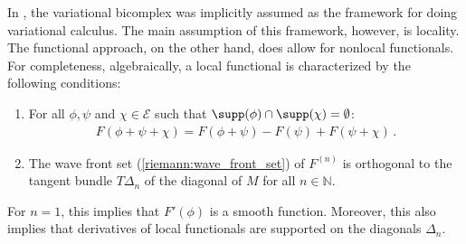     \begin{remark}
        In , the variational bicomplex was implicitly assumed as the framework for doing variational calculus. The main assumption of this framework, however, is locality. The functional approach, on the other hand, does allow for nonlocal functionals. For completeness, algebraically, a local functional is characterized by the following conditions:
        \begin{enumerate}
            \item For all $\phi,\psi$ and $\chi\in\mathcal{E}$ such that $\supp(\phi)\cap\supp(\chi)=\emptyset$:
                \begin{gather}
                    F(\phi+\psi+\chi)=F(\phi+\psi)-F(\psi)+F(\psi+\chi)\,.
                \end{gather}
            \item The wave front set (\cref{riemann:wave_front_set}) of $F^{(n)}$ is orthogonal to the tangent bundle $T\Delta_n$ of the diagonal of $M$ for all $n\in\mathbb{N}$.
        \end{enumerate}
        For $n=1$, this implies that $F'(\phi)$ is a smooth function. Moreover, this also implies that derivatives of local functionals are supported on the diagonals $\Delta_n$.
    \end{remark}

